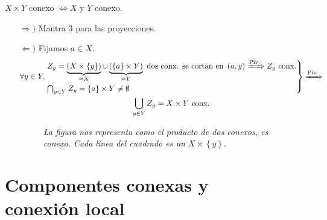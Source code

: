 \begin{prop}
$X \times Y$ conexo $\Leftrightarrow X$ y $Y$ conexo.
\end{prop} 
\begin{demo}
\begin{itemize}
    \item[$\Rightarrow)$] Mantra $3$ para las proyecciones.

    \item[$\Leftarrow)$] Fijamos $a \in X$.
    \begin{gather*}    
    \forall y \in Y,
    \begin{rcases}
        Z_y = \underbrace{\left( X \times \{y\} \right)}_{\approx X}\cup \underbrace{\left( \{a\} \times Y \right)}_{\approx Y} \text{ dos conx. se cortan en } \left( a, y \right) \xRightarrow{\text{Piv.}} Z_y \text{ conx.}\\
        \bigcap_{y \in Y} Z_y = \{a\} \times Y \neq \emptyset
    \end{rcases} \xRightarrow{\text{Piv.}} \\
    \bigcup_{y \in Y} Z_y = X \times Y \text{ conx.} 
    \end{gather*}
    \begin{figure}[H]
        \centering
        \caption{\textit{La figura nos representa como el producto de dos conexos, es conexo. Cada línea del cuadrado es un $X \times \left\{ y \right\}.$}}
    \end{figure}
\end{itemize}
\end{demo}


\chapter{Componentes conexas y\texorpdfstring{\\}{} conexión local}%
\label{cha:componentes_conexas_y_conexion_local}
